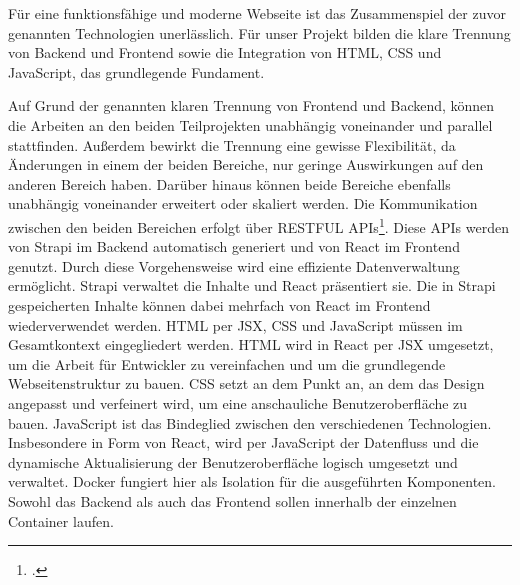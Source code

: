 Für eine funktionsfähige und moderne Webseite ist das Zusammenspiel der zuvor genannten Technologien unerlässlich. Für unser Projekt bilden die klare Trennung von Backend und Frontend sowie die Integration von HTML, CSS und JavaScript, das grundlegende Fundament.

Auf Grund der genannten klaren Trennung von Frontend und Backend, können die Arbeiten an den beiden Teilprojekten unabhängig voneinander und parallel stattfinden. Außerdem bewirkt die Trennung eine gewisse Flexibilität, da Änderungen in einem der beiden Bereiche, nur geringe Auswirkungen auf den anderen Bereich haben. Darüber hinaus können beide Bereiche ebenfalls unabhängig voneinander erweitert oder skaliert werden.
Die Kommunikation zwischen den beiden Bereichen erfolgt über RESTFUL APIs\footcite{Vgl. ehsan_restful_2022}. Diese APIs werden von Strapi im Backend automatisch generiert und von React im Frontend genutzt. Durch diese Vorgehensweise wird eine effiziente Datenverwaltung ermöglicht. Strapi verwaltet die Inhalte und React präsentiert sie. Die in Strapi gespeicherten Inhalte können dabei mehrfach von React im Frontend wiederverwendet werden.
HTML per JSX, CSS und JavaScript müssen im Gesamtkontext eingegliedert werden. HTML wird in React per JSX umgesetzt, um die Arbeit für Entwickler zu vereinfachen und um die grundlegende Webseitenstruktur zu bauen. CSS setzt an dem Punkt an, an dem das Design angepasst und verfeinert wird, um eine anschauliche Benutzeroberfläche zu bauen. JavaScript ist das Bindeglied zwischen den verschiedenen Technologien. Insbesondere in Form von React, wird per JavaScript der Datenfluss und die dynamische Aktualisierung der Benutzeroberfläche logisch umgesetzt und verwaltet.
Docker fungiert hier als Isolation für die ausgeführten Komponenten. Sowohl das Backend als auch das Frontend sollen innerhalb der einzelnen Container laufen.